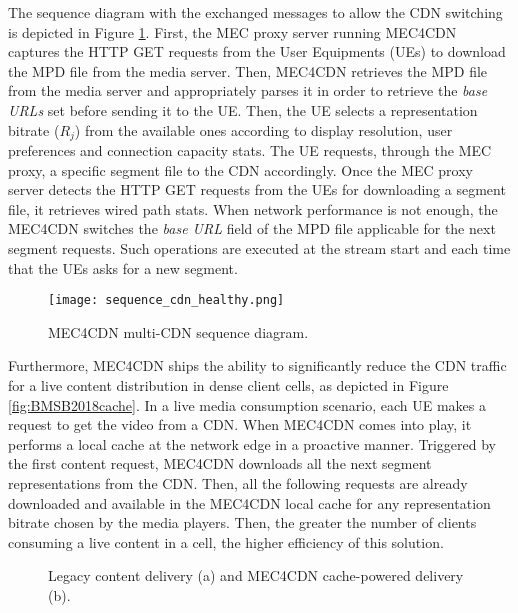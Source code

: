 The sequence diagram with the exchanged messages to allow the CDN switching is depicted in Figure \ref{fig:BMSB2018sequence_cdn}. First, the MEC proxy server running MEC4CDN captures the HTTP GET requests from the User Equipments (UEs) to download the MPD file from the media server. Then, MEC4CDN retrieves the MPD file from the media server and appropriately parses it in order to retrieve the \textit{base URLs} set before sending it to the UE. Then, the UE selects a representation bitrate ($R_j$) from the available ones according to display resolution, user preferences and connection capacity stats. The UE requests, through the MEC proxy, a specific segment file to the CDN accordingly. Once the MEC proxy server detects the HTTP GET requests from the UEs for downloading a segment file, it retrieves wired path stats. When network performance is not enough, the MEC4CDN switches the \textit{base URL} field of the MPD file applicable for the next segment requests. Such operations are executed at the stream start and each time that the UEs asks for a new segment.

\begin{figure}[htp]
	\centering
	\texttt{[image: sequence\_cdn\_healthy.png]}
	\caption{MEC4CDN multi-CDN sequence diagram.}
	\label{fig:BMSB2018sequence_cdn}
\end{figure}

Furthermore, MEC4CDN ships the ability to significantly reduce the CDN traffic for a live content distribution in dense client cells, as depicted in Figure \ref{fig:BMSB2018cache}. In a live media consumption scenario, each UE makes a request to get the video from a CDN. When MEC4CDN comes into play, it performs a local cache at the network edge in a proactive manner. Triggered by the first content request, MEC4CDN downloads all the next segment representations from the CDN. Then, all the following requests are already downloaded and available in the MEC4CDN local cache for any representation bitrate chosen by the media players. Then, the greater the number of clients consuming a live content in a cell, the higher efficiency of this solution.

\begin{figure}[htp]
	\centering
	\hfil
	\hfil
	\caption{Legacy content delivery (a) and MEC4CDN cache-powered delivery (b).}
\end{figure}


